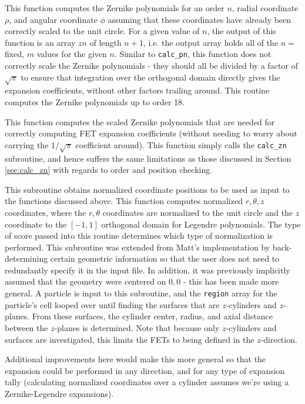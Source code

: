 \documentclass[10pt]{article}
\newcounter{subsubsubsection}[subsubsection]
\numberwithin{equation}{section} %
\begin{document}
\label{sec:calc_zn}
This function computes the Zernike polynomials for an order \(n\), radial coordinate \(\rho\), and angular coordinate \(\phi\) assuming that these coordinates have already been correctly scaled to the unit circle. For a given value of \(n\), the output of this function is an array \(zn\) of length \(n+1\), i.e. the output array holds all of the \(n=\) fixed, \(m\) values for the given \(n\). Similar to {\tt calc\_pn}, this function does not correctly scale the Zernike polynomials - they should all be divided by a factor of \(\sqrt{\pi}\) to ensure that integration over the orthogonal domain directly gives the expansion coefficients, without other factors trailing around. This routine computes the Zernike polynomials up to order 18.

This function computes the scaled Zernike polynomials that are needed for correctly computing FET expansion coefficients (without needing to worry about carrying the \(1/\sqrt{\pi}\) coefficient around). This function simply calls the {\tt calc\_zn} subroutine, and hence suffers the same limitations as those discussed in Section \ref{sec:calc_zn} with regards to order and position checking.

This subroutine obtains normalized coordinate positions to be used as input to the functions discussed above. This function computes normalized \(r, \theta, z\) coordinates, where the \(r, \theta\) coordinates are normalized to the unit circle and the \(z\) coordinate to the \([-1, 1]\) orthogonal domain for Legendre polynomials. The type of score passed into this routine determines which type of normalization is performed. This subroutine was extended from Matt's implementation by back-determining certain geometric information so that the user does not need to redundantly specify it in the input file. In addition, it was previously implicitly assumed that the geometry were centered on \(0, 0\) - this has been made more general. A particle is input to this subroutine, and the {\tt region} array for the particle's cell looped over until finding the surfaces that are \(z\)-cylinders and \(z\)-planes. From these surfaces, the cylinder center, radius, and axial distance between the \(z\)-planes is determined. Note that because only \(z\)-cylinders and surfaces are investigated, this limits the FETs to being defined in the \(z\)-direction. 

\color{magenta}
Additional improvements here would make this more general so that the expansion could be performed in any direction, and for any type of expansion tally (calculating normalized coordinates over a cylinder assumes we're using a Zernike-Legendre expansions).
\color{black}
\end{document}
